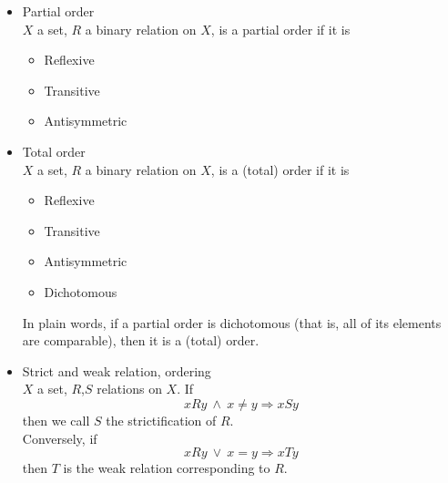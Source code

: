 \documentclass[margin=0px]{article}
\begin{document}
\begin{description}
\begin{itemize}
                  A system $\mathcal{O}$ of subsets of $X$ is called a classification (partition) if $\mathcal{O}$ is a set system consisting of pairwise disjoint nonempty sets for which $\cup\mathcal{O} = X$
                  \\\\
                  Theorem: \\
                  An equivalence relation determines a classification. Conversely: for a classification $\mathcal{O}$, \\ ${R = \cup\{Y\times Y : Y \in \mathcal{O} \}}$ is an equivalence relation.

            \item Partial order\\
                  $X$ a set, $R$ a binary relation on $X$, is a partial order if it is
                  \begin{itemize}
                      \item Reflexive
                      \item Transitive
                      \item Antisymmetric
                  \end{itemize}
            \item Total order \\
                  $X$ a set, $R$ a binary relation on $X$, is a (total) order if it is
                  \begin{itemize}
                      \item Reflexive
                      \item Transitive
                      \item Antisymmetric
                      \item Dichotomous
                  \end{itemize}
                  In plain words, if a partial order is dichotomous (that is, all of its elements are comparable), then it is a (total) order.
            \item Strict and weak relation, ordering \\
                  $X$ a set, $R$,$S$ relations on $X$. If
                  \[ xRy \ \land \ x \neq y \Rightarrow xSy\]
                  then we call $S$ the strictification of $R$.\\
                  Conversely, if
                  \[  xRy \ \lor \ x = y \Rightarrow xTy \]
                  then $T$ is the weak relation corresponding to $R$.\\


\end{itemize}
\end{description}
\end{document}
